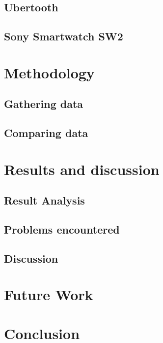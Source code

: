 \documentclass{article}
\begin{document}
	\subsection{Ubertooth}
	\subsection{Sony Smartwatch SW2} %
	
\newpage
\section{Methodology}		%
 
	\subsection{Gathering data} %
	
	\subsection{Comparing data}	%
	
\newpage
\section{Results and discussion}

		\subsection{Result Analysis}
		
		\subsection{Problems encountered}
		
		\subsection{Discussion}
		
\newpage
\section{Future Work}
\newpage

\section{Conclusion}

\newpage




\vspace*{2\baselineskip} %


{}

\end{document}
